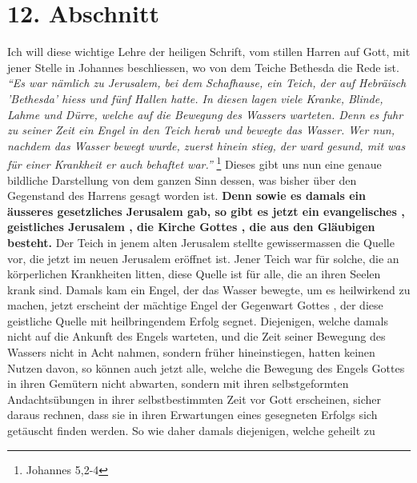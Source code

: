 \section{12. Abschnitt} \label{kap6_ab12}

\label{ref:06_12_wahre_kirche}
Ich will diese wichtige Lehre der heiligen Schrift, vom stillen Harren auf Gott,
mit jener Stelle in Johannes beschliessen, wo von dem Teiche Bethesda
die Rede ist.
\textit{"`Es war nämlich zu Jerusalem, bei dem Schafhause, ein Teich, der
auf Hebräisch 'Bethesda' hiess und fünf Hallen hatte. In diesen lagen viele
Kranke, Blinde, Lahme und Dürre, welche auf die Bewegung des Wassers warteten.
Denn es fuhr zu seiner Zeit ein Engel in den Teich herab und bewegte das
Wasser. Wer nun, nachdem das Wasser bewegt wurde, zuerst hinein stieg, der ward
gesund, mit was für einer Krankheit er auch behaftet war."'}
\footnote{Johannes 5,2-4}
Dieses gibt uns nun eine genaue bildliche Darstellung von dem ganzen Sinn
dessen, was bisher über den Gegenstand des Harrens gesagt worden ist.
\textbf{Denn sowie
es damals ein äusseres gesetzliches Jerusalem
gab, so gibt es jetzt ein
evangelisches , geistliches Jerusalem
, die Kirche Gottes , die aus
den Gläubigen  
besteht.} Der Teich in jenem alten Jerusalem 
stellte gewissermassen die Quelle
vor, die jetzt im neuen Jerusalem  eröffnet ist.
Jener Teich war für solche, die
an körperlichen Krankheiten litten, diese Quelle ist für alle, die an ihren
Seelen krank sind. Damals kam ein Engel, der das Wasser bewegte, um es
heilwirkend zu machen, jetzt erscheint der mächtige Engel
 der
Gegenwart Gottes ,
der diese geistliche Quelle  mit heilbringendem Erfolg
segnet. Diejenigen,
welche damals nicht auf die Ankunft des Engels warteten, und die Zeit seiner
Bewegung des Wassers nicht in Acht nahmen, sondern früher hineinstiegen, hatten
keinen Nutzen davon, so können auch jetzt alle, welche die Bewegung des Engels
Gottes in ihren Gemütern nicht abwarten, sondern mit ihren selbstgeformten
Andachtsübungen in ihrer selbstbestimmten Zeit vor Gott erscheinen, sicher
daraus rechnen, dass sie in ihren Erwartungen eines gesegneten Erfolgs sich
getäuscht finden werden. So wie daher damals diejenigen, welche geheilt zu
